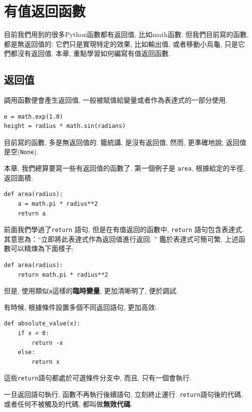 \documentclass[10pt]{book}
\begin{document}
\chapter{有值返回函數}
\label{fruitchap}

目前我們用到的很多Python函數都有返回值, 比如math函數. 
但我們目前寫的函數, 都是無返回值的: 它們只是實現特定的效果, 比如輸出值, 
或者移動小烏龜, 只是它們都沒有返回值. 
本章, 重點學習如何編寫有值返回函數. 

\section{返回值}

調用函數便會產生返回值, 一般被賦值給變量或者作為表達式的一部分使用. 

\begin{verbatim}
e = math.exp(1.0)
height = radius * math.sin(radians)
\end{verbatim}
%
目前寫的函數, 多是無返回值的. 籠統講, 是沒有返回值, 然而, 
更準確地說, 返回值是空({\tt None}).

本章, 我們總算要寫一些有返回值的函數了. 
第一個例子是 {\tt area}, 根據給定的半徑, 返回面積:

\begin{verbatim}
def area(radius):
    a = math.pi * radius**2
    return a
\end{verbatim}
%
前面我們學過了{\tt return} 語句, 但是在有值返回的函數中, 
{\tt return} 語句包含表達式. 
其意思為：``立即將此表達式作為返回值進行返回. ''
鑑於表達式可簡可繁, 上述函數可以精煉為下面樣子:

\begin{verbatim}
def area(radius):
    return math.pi * radius**2
\end{verbatim}
%
但是, 使用類似{\tt a}這樣的{\bf 臨時變量}, 更加清晰明了, 便於調試. 

有時候, 根據條件設置多個不同返回語句, 更加高效:

\begin{verbatim}
def absolute_value(x):
    if x < 0:
        return -x
    else:
        return x
\end{verbatim}
%
這些{\tt return}語句都處於可選條件分支中, 而且, 只有一個會執行. 

一旦返回語句執行, 函數不再執行後續語句, 立刻終止運行. 
{\tt return}語句後的代碼, 或者任何不被觸及的代碼, 都叫做{\bf 無效代碼}.
\end{document}
